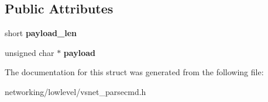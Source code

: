 \subsection*{Public Attributes}
\begin{DoxyCompactItemize}
\item 
short {\bfseries payload\+\_\+len}\hypertarget{structVsnetDownload_1_1Adapter_1_1DownloadLastFragment_ae004e4dc5af071ed748395beee960b5b}{}\label{structVsnetDownload_1_1Adapter_1_1DownloadLastFragment_ae004e4dc5af071ed748395beee960b5b}

\item 
unsigned char $\ast$ {\bfseries payload}\hypertarget{structVsnetDownload_1_1Adapter_1_1DownloadLastFragment_a9da0eaeea766c010e04ed34416202eb6}{}\label{structVsnetDownload_1_1Adapter_1_1DownloadLastFragment_a9da0eaeea766c010e04ed34416202eb6}

\end{DoxyCompactItemize}


The documentation for this struct was generated from the following file\+:\begin{DoxyCompactItemize}
\item 
networking/lowlevel/vsnet\+\_\+parsecmd.\+h\end{DoxyCompactItemize}

